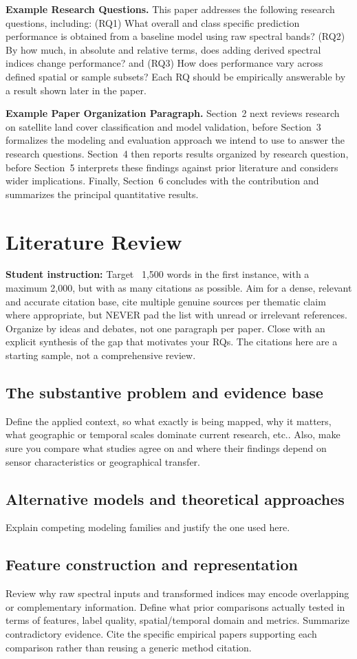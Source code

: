 \documentclass[11pt,letterpaper]{article}
\newcommand{\guide}[1]{\par\begingroup\color{blue!60!black}\small\textbf{Student
instruction:} #1\par\endgroup}
\begin{document}
\textbf{Example Research Questions.} This paper addresses the following research questions, 
including: (RQ1) What overall and
class specific prediction performance is obtained from a baseline model using raw spectral
bands? (RQ2) By how much, in absolute and relative terms, does adding derived spectral
indices change performance? and (RQ3) How does performance vary across defined spatial or
sample subsets? Each RQ should be empirically answerable by a result shown later in the
paper.

\textbf{Example Paper Organization Paragraph.} Section~2 next reviews research on satellite land cover
classification and model validation, before Section~3 formalizes the modeling and evaluation
approach we intend to use to answer the research questions. Section~4 then reports
results organized by research question, before Section~5 interprets these findings against prior
literature and considers wider implications. Finally, Section~6 concludes with the contribution and
summarizes the principal quantitative results.

\section{Literature Review}
\guide{Target ~1,500 words in the first instance, with a maximum 2,000, but with as many citations as possible. 
Aim for a dense, relevant and accurate citation
base, cite multiple genuine sources per thematic claim where appropriate, but NEVER pad
the list with unread or irrelevant references. Organize by ideas and debates, not one
paragraph per paper. Close with an explicit synthesis of the gap that motivates your RQs.
The citations here are a starting sample, not a comprehensive review.}
\subsection{The substantive problem and evidence base}
Define the applied context, so what exactly is being mapped, why it matters, what geographic or
temporal scales dominate current research, etc.. Also, make sure you compare what studies agree on and where their
findings depend on sensor characteristics or geographical transfer. 
\subsection{Alternative models and theoretical approaches}
Explain competing modeling families and justify the one used here. 
\subsection{Feature construction and representation}
Review why raw spectral inputs and transformed indices may encode overlapping or
complementary information. Define what prior comparisons actually tested in terms of features, label
quality, spatial/temporal domain and metrics. Summarize contradictory evidence. Cite the specific 
empirical papers supporting each
comparison rather than reusing a generic method citation.
\end{document}
